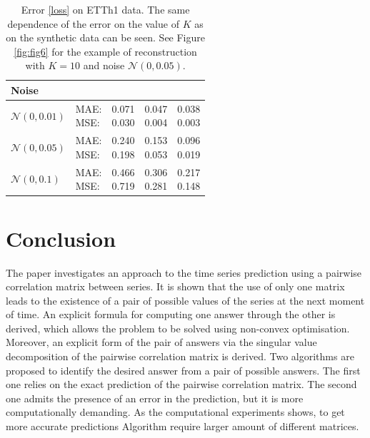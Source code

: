 \documentclass[12pt]{article}
\begin{document}
{\begin{table}[!h]
\def\arraystretch{2.3}
\begin{center}
\caption{Error \eqref{loss} on ETTh1 data. The same dependence of the error on the value of $K$ as on the synthetic data can be seen. See Figure \ref{fig:fig6} for the example of reconstruction with $K=10$ and noise $\mathcal{N}(0, 0.05)$.}
\begin{tabular}{|l||l||*{3}{c|}}\hline
	{Noise}
	&\makebox[3em]{Metric}&\makebox[3em]{$K=2$}&\makebox[3em]{$K=4$}&\makebox[3em]{$K=10$}\\\hline
	$\mathcal{N}(0, 0.01)$&\makecell{ MAE: \\ MSE: } &\makecell{ 0.071 \\ 0.030 }&\makecell{ 0.047 \\ 0.004 }&\makecell{ 0.038 \\ 0.003 }\\\hline
	$\mathcal{N}(0, 0.05)$&\makecell{ MAE: \\ MSE: } &\makecell{ 0.240 \\ 0.198 }&\makecell{ 0.153 \\ 0.053 }&\makecell{ 0.096 \\ 0.019 }\\\hline
	$\mathcal{N}(0, 0.1)$& \makecell{ MAE: \\ MSE: } &\makecell{ 0.466 \\ 0.719 }&\makecell{ 0.306 \\ 0.281 }&\makecell{ 0.217 \\ 0.148 }\\\hline
\end{tabular}
\end{center}
\end{table}

\section{Conclusion}
The paper investigates an approach to the time series prediction using a pairwise correlation matrix between series. It is shown that the use of only one matrix leads to the existence of a pair of possible values of the series at the next moment of time. An explicit formula for computing one answer through the other is derived, which allows the problem to be solved using non-convex optimisation. Moreover, an explicit form of the pair of answers via the singular value decomposition of the pairwise correlation matrix is derived. Two algorithms are proposed to identify the desired answer from a pair of possible answers. The first one relies on the exact prediction of the pairwise correlation matrix. The second one admits the presence of an error in the prediction, but it is more computationally demanding. As the computational experiments shows, to get more accurate predictions Algorithm require larger amount of different matrices.

}
\end{document}
